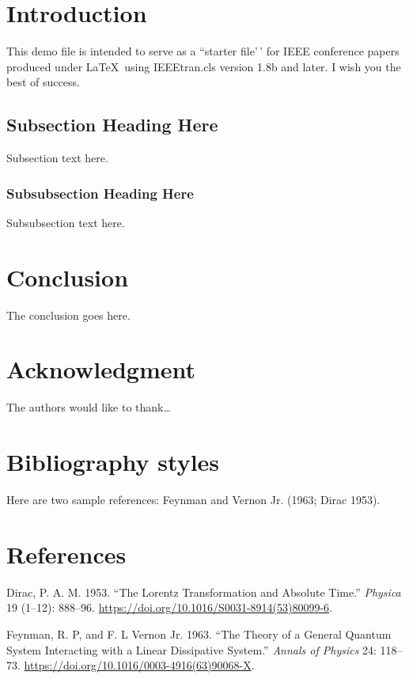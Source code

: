 \documentclass[conference,final,]{IEEEtran}
\newlength{\cslhangindent}
\newenvironment{CSLReferences}[2] %
 {\begin{list}{}{%
  \setlength{\itemindent}{0pt}
  \setlength{\leftmargin}{0pt}
  \setlength{\parsep}{0pt}
  \ifodd #1
   \setlength{\leftmargin}{\cslhangindent}
   \setlength{\itemindent}{-1\cslhangindent}
  \fi
  \setlength{\itemsep}{#2\baselineskip}}}
 {\end{list}}
\begin{document}
\section{Introduction}\label{introduction}

This demo file is intended to serve as a ``starter file'\,' for IEEE
conference papers produced under \LaTeX~using IEEEtran.cls version 1.8b
and later. I wish you the best of success.

\subsection{Subsection Heading Here}\label{subsection-heading-here}

Subsection text here.

\subsubsection{Subsubsection Heading
Here}\label{subsubsection-heading-here}

Subsubsection text here.

\section{Conclusion}\label{conclusion}

The conclusion goes here.

\section{Acknowledgment}\label{acknowledgment}

The authors would like to thank\ldots{}

\section{Bibliography styles}\label{bibliography-styles}

Here are two sample references: Feynman and Vernon Jr. (1963; Dirac
1953).

\newpage

\section*{References}\label{references}

\label{refs}
\begin{CSLReferences}{1}{0}
Dirac, P. A. M. 1953. {``The Lorentz Transformation and Absolute
Time.''} \emph{Physica} 19 (1--12): 888--96.
\url{https://doi.org/10.1016/S0031-8914(53)80099-6}.

Feynman, R. P, and F. L Vernon Jr. 1963. {``The Theory of a General
Quantum System Interacting with a Linear Dissipative System.''}
\emph{Annals of Physics} 24: 118--73.
\url{https://doi.org/10.1016/0003-4916(63)90068-X}.

\end{CSLReferences}
\end{document}
